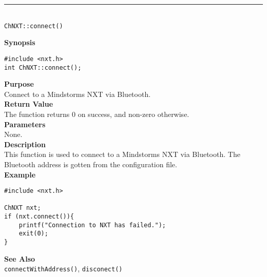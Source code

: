 \noindent
\vspace{5pt}
\rule{4.5in}{0.015in}\\
\noindent
{\LARGE \texttt{ChNXT::connect()} }\\


\noindent
{\bf Synopsis}
\vspace{-8pt}
\begin{verbatim}
#include <nxt.h>
int ChNXT::connect();
\end{verbatim}

\noindent
{\bf Purpose}\\
Connect to a Mindstorms NXT via Bluetooth.\\

\noindent
{\bf Return Value}\\
The function returns 0 on success, and non-zero otherwise.\\

\noindent
{\bf Parameters}\\
None.\\

\noindent
{\bf Description}\\
This function is used to connect to a Mindstorms NXT via Bluetooth. The Bluetooth address is gotten from the configuration file.\\

\noindent
{\bf Example}
\begin{verbatim}
#include <nxt.h> 

ChNXT nxt;
if (nxt.connect()){
    printf("Connection to NXT has failed.");
    exit(0);
}
\end{verbatim}

\noindent
{\bf See Also}\\
\texttt{connectWithAddress()}, \texttt{disconect()}\\
